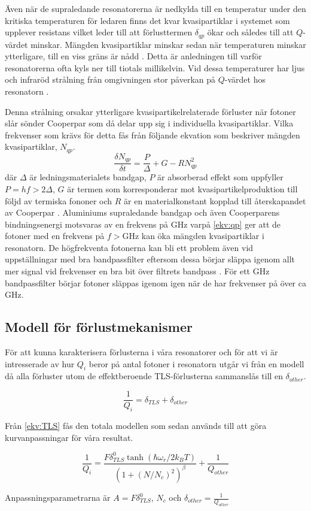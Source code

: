 \documentclass[main.tex]{subfiles}
\begin{document}
Även när de supraledande resonatorerna är nedkylda till en temperatur under den kritiska temperaturen för ledaren finns det kvar kvasipartiklar i systemet som upplever resistans vilket leder till att förlusttermen $\delta_{qp}$ ökar och således till att $Q$-värdet minskar. Mängden kvasipartiklar minskar sedan när temperaturen minskar ytterligare, till en viss gräns är nådd \cite{Barends2011}. Detta är anledningen till varför resonatorerna ofta kyls ner till tiotals millikelvin. Vid dessa temperaturer har ljus och infraröd strålning från omgivningen stor påverkan på $Q$-värdet hos resonatorn \cite{Barends2011}.

Denna strålning orsakar ytterligare kvasipartikelrelaterade förluster när fotoner slår sönder Cooperpar som då delar upp sig i individuella kvasipartiklar. Vilka frekvenser som krävs för detta fås från följande ekvation som beskriver mängden kvasipartiklar, $N_{qp}$.
\begin{equation}
\label{ekv:qp}
    \frac{\delta N_{qp}}{\delta t}=\frac{P}{\Delta}+G-RN_{qp}^2
\end{equation}
där $\Delta$ är ledningsmaterialets bandgap, $P$ är absorberad effekt som uppfyller $P=hf>2\Delta$, $G$ är termen som korresponderar mot kvasipartikelproduktion till följd av termiska fononer och $R$ är en materialkonstant kopplad till återskapandet av Cooperpar \cite{Barends2011}. Aluminiums supraledande bandgap och även Cooperparens bindningsenergi motsvaras av en frekvens på \unit[88]{GHz} varpå \eqref{ekv:qp} ger att de fotoner med en frekvens på $f>$\unit[88]{GHz} kan öka mängden kvasipartiklar i resonatorn.
De högfrekventa fotonerna kan bli ett problem även vid uppställningar med bra bandpassfilter eftersom dessa börjar släppa igenom allt mer signal vid frekvenser en bra bit över filtrets bandpass \cite{santavicca2008}. För ett \unit[4-8]{GHz} bandpassfilter börjar fotoner släppas igenom igen när de har frekvenser på över ca \unit[20]{GHz}.

\subsection{Modell för förlustmekanismer}
För att kunna karakterisera förlusterna i våra resonatorer och för att vi är intresserade av hur $Q_i$ beror på antal fotoner i resonatorn utgår vi från en modell då alla förluster utom de effektberoende TLS-förlusterna sammanslås till en $\delta_{other}$.

\begin{equation*}
    \frac{1}{Q_i}=\delta_{TLS}+\delta_{other}
\end{equation*}
\noindent

Från \ref{ekv:TLS} fås den totala modellen som sedan används till att göra kurvanpassningar för våra resultat.

\begin{equation}
    \label{ekv:TLSmodel}
    \frac{1}{Q_i}=\frac{F\delta_{TLS}^0\tanh{(\hbar\omega_r/2k_BT)}}{(1+(N/N_c)^2)^\beta}+\frac{1}{Q_{other}}
\end{equation}

Anpassningsparametrarna är $A=F\delta_{TLS}^0$, $N_c$ och $\delta_{other}=\frac{1}{Q_{other}}$
\end{document}
